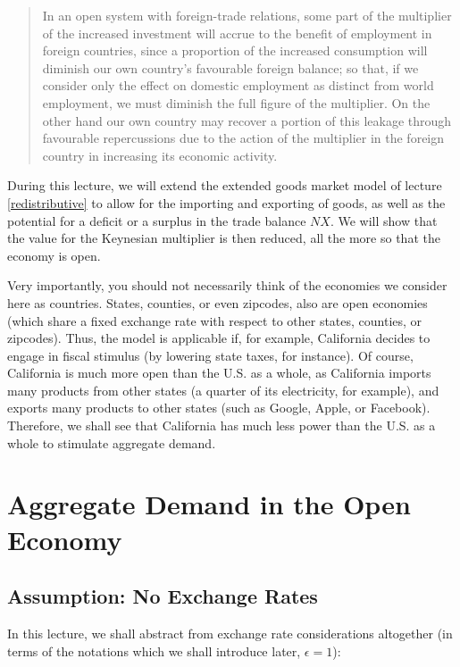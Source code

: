 \documentclass[]{book}
\theoremstyle{definition}
\theoremstyle{definition}
\theoremstyle{definition}
\theoremstyle{remark}
\begin{document}
\begin{quote}
In an open system with foreign-trade relations, some part of the
multiplier of the increased investment will accrue to the benefit of
employment in foreign countries, since a proportion of the increased
consumption will diminish our own country's favourable foreign balance;
so that, if we consider only the effect on domestic employment as
distinct from world employment, we must diminish the full figure of the
multiplier. On the other hand our own country may recover a portion of
this leakage through favourable repercussions due to the action of the
multiplier in the foreign country in increasing its economic activity.
\end{quote}

During this lecture, we will extend the extended goods market model of
lecture \ref{redistributive} to allow for the importing and exporting of
goods, as well as the potential for a deficit or a surplus in the trade
balance \(NX\). We will show that the value for the Keynesian multiplier
is then reduced, all the more so that the economy is open.

Very importantly, you should not necessarily think of the economies we
consider here as countries. States, counties, or even zipcodes, also are
open economies (which share a fixed exchange rate with respect to other
states, counties, or zipcodes). Thus, the model is applicable if, for
example, California decides to engage in fiscal stimulus (by lowering
state taxes, for instance). Of course, California is much more open than
the U.S. as a whole, as California imports many products from other
states (a quarter of its electricity, for example), and exports many
products to other states (such as Google, Apple, or Facebook).
Therefore, we shall see that California has much less power than the
U.S. as a whole to stimulate aggregate demand.

\section{Aggregate Demand in the Open
Economy}\label{aggregate-demand-in-the-open-economy}

\subsection{Assumption: No Exchange
Rates}\label{assumption-no-exchange-rates}

In this lecture, we shall abstract from exchange rate considerations
altogether (in terms of the notations which we shall introduce later,
\(\epsilon=1\)):
\end{document}
